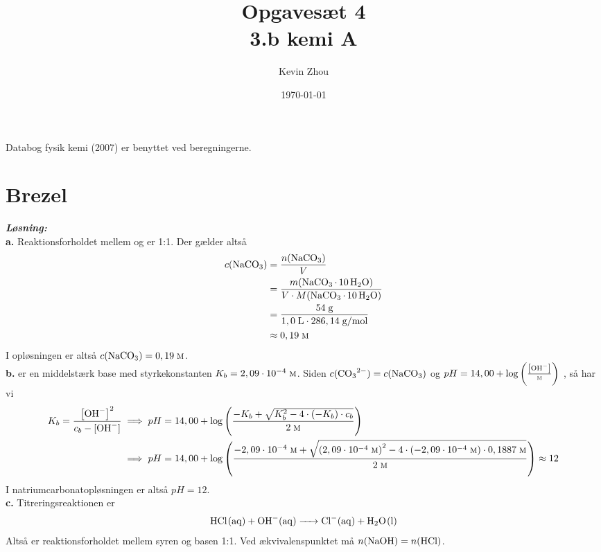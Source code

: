 \documentclass{report}
\title{Opgavesæt 4\\
{\Large \textbf{3.b kemi A}}}
\author{Kevin Zhou}
\date{\today}
\newcommand{\sol}{\setlength{\parindent}{0cm}\textbf{\textit{Løsning:}}\setlength{\parindent}{1cm}}
\begin{document}
\maketitle
\begin{note}
  Databog fysik kemi (2007) er benyttet ved beregningerne.
\end{note}
\section*{Brezel}
\sol \\
\textbf{a.}
Reaktionsforholdet mellem  og  er 1:1.
Der gælder altså 
\begin{equation*}
\begin{split}
  c(\ce{NaCO3} )&=\frac{n(\ce{NaCO3} )}{V}\\
  &=\frac{m(\ce{NaCO3.10H2O} )}{V \cdot M(\ce{NaCO3.10H2O})}\\
  &=\frac{54 \;\unit{g} }{1,0 \;\unit{L} \cdot 286,14 \;\unit{g/mol} }\\
  &\approx 0,19 \;\unit{\textsc{m}} 
\end{split}
\end{equation*}
I opløsningen er altså $c(\ce{NaCO3} )=0,19 \;\unit{\textsc{m}} $.\\[1ex]
\textbf{b.}
 er en middelstærk base med styrkekonstanten $K_b=2,09 \cdot 10^{-4} \;\unit{\textsc{m}} $.
Siden $c(\ce{CO3^2-} )=c(\ce{NaCO3} )$ og $pH=14,00 + \log\left(\frac{\left[\ce{OH-} \right]}{\textsc{m}}\right) $ , så har vi 
\begin{equation*}
\begin{split}
  K_b=\frac{\left[\ce{OH-} \right]^2}{c_b-[\ce{OH-} ]} &\implies pH=14,00 + \log\left(\frac{-K_b + \sqrt{K_b^2 - 4 \cdot \left(-K_b\right) \cdot c_b } }{2 \;\unit{\textsc{m}} }\right)\\
  &\implies pH=14,00 + \log\left(\frac{-2,09 \cdot 10 ^{-4} \;\unit{\textsc{m}} +\sqrt{\left(2,09 \cdot 10 ^{-4}\;\unit{\textsc{m}} \right)^2-4 \cdot \left(-2,09 \cdot 10 ^{-4} \;\unit{\textsc{m}}\right) \cdot 0,1887 \;\unit{\textsc{m}} } }{2 \;\unit{\textsc{m}} }\right) \approx 12 \\
\end{split}
\end{equation*}
I natriumcarbonatopløsningen er altså $pH=12$.\\[1ex]
\textbf{c.}
Titreringsreaktionen er 
\[
\ce{HCl(aq) + OH-(aq) -> Cl-(aq) + H2O(l)} 
\] 
Altså er reaktionsforholdet mellem syren og basen 1:1.
Ved ækvivalenspunktet må $n(\ce{NaOH} )=n(\ce{HCl} )$.
\end{document}
